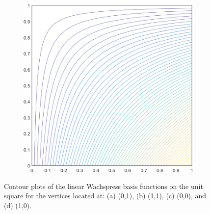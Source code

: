 \begin{figure}
\begin{subfigure}[b]{0.39\textwidth}
		\caption{}
	\end{subfigure}
	\hspace{1.5cm}
	\begin{subfigure}[b]{0.39\textwidth}
		\centering
		\includegraphics[width=\textwidth]{figures/sec_BF/square_WACHSPRESS1_contour_b2.png}
		\caption{}
	\end{subfigure}
\caption{Contour plots of the linear Wachspress basis functions on the unit square for the vertices located at: (a) (0,1), (b) (1,1), (c) (0,0), and (d) (1,0).}
\end{figure}

